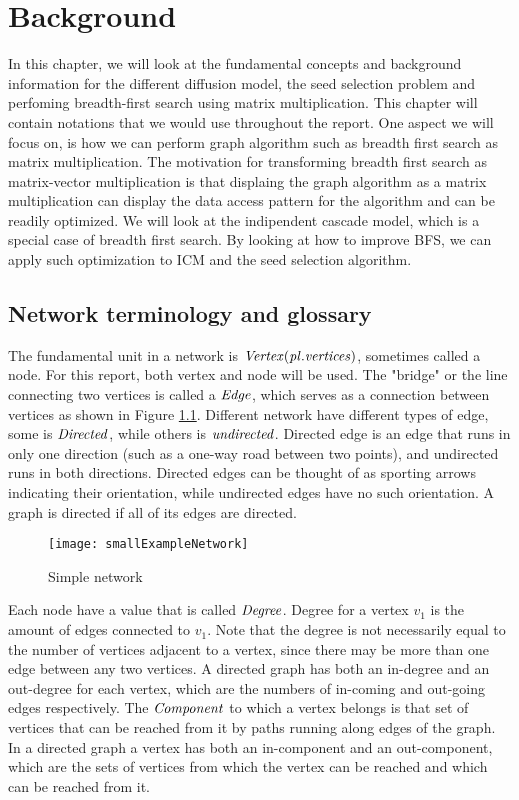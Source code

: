 \chapter{Background}

In this chapter, we will look at the fundamental concepts and background information for the different diffusion model, the seed selection problem and perfoming breadth-first search using matrix multiplication. This chapter will contain notations that we would use throughout the report. One aspect we will focus on, is how we can perform graph algorithm such as breadth first search as matrix multiplication. The motivation for transforming breadth first search as matrix-vector multiplication is that displaing the graph algorithm as a matrix multiplication can display the data access pattern for the algorithm and can be readily optimized\cite{AlgoToMath}. We will look at the indipendent cascade model, which is a special case of breadth first search\cite{HybridBFS2015}. By looking at how to improve BFS, we can apply such optimization to ICM and the seed selection algorithm. 


\section{Network terminology and glossary}
The fundamental unit in a network is $\it{{Vertex}} (pl. vertices)$, sometimes called a node. For this report, both vertex and node will be used. The "bridge" or the line connecting two vertices is called a $\it{{Edge}}$, which serves as a connection between vertices as shown in Figure \ref{fig:SimpleGraph}.  Different network have different types of edge, some is $\it{Directed}$, while others is $\it{undirected}$. Directed edge is an edge that runs in only one direction (such as a one-way road between two points), and undirected runs in both directions. Directed edges can be thought of as sporting arrows indicating their orientation, while undirected edges have no such orientation. A graph is directed if all of its edges are directed.

\begin{figure}[!ht]
	\texttt{[image: smallExampleNetwork]}
	\caption{Simple network} 
	\label{fig:SimpleGraph}
\end{figure}


Each node have a value that is called $\it{{Degree}}$. Degree for a vertex $v_1$ is the amount of edges connected to $v_1$. Note that the degree is not necessarily equal to the number of vertices adjacent to a vertex, since there may be more than one edge between any two vertices. A directed graph has both an in-degree and an out-degree for each vertex, which are the numbers of in-coming and out-going edges respectively. The $\it{{Component}}$ to which a vertex belongs is that set of vertices that can be reached from it by paths running along edges of the graph. In a directed graph a vertex has both an in-component and an out-component, which are the sets of vertices from which the vertex can be reached and which can be reached from it.

